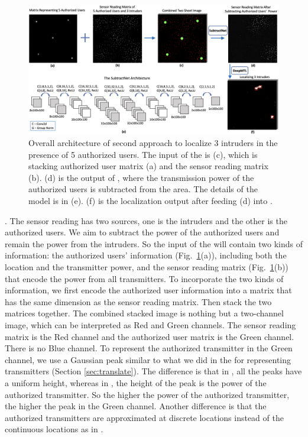 \begin{figure}
    \centering
    \includegraphics[width=\textwidth]{chapters/wowmom-pmc/figures/subtractnet2.png}
    \caption{Overall architecture of second approach to localize 3 intruders in the presence of 5 authorized users. The input of the \subtract is (c), which is stacking authorized user matrix (a) and the sensor reading matrix (b). (d) is the output of \subtract, where the transmission power of the authorized users is subtracted from the area. The details of the \subtract model is in (e). (f) is the localization output after feeding (d) into \our.}
    \label{fig:subtractnet}
\end{figure}

. The sensor reading has two sources, one is the intruders and the other is the authorized users.
We aim to subtract the power of the authorized users and remain the power from the intruders.
So the input of the \subtract will contain two kinds of information: the authorized users' information (Fig.~\ref{fig:subtractnet}(a)), including both the location and the transmitter power, and the sensor reading matrix (Fig.~\ref{fig:subtractnet}(b)) that encode the power from all transmitters.
To incorporate the two kinds of information, we first encode the authorized user information into a matrix that has the same dimension as the sensor reading matrix.
Then stack the two matrices together.
The combined stacked image is nothing but a two-channel image, which can be interpreted as Red and Green channels.
The sensor reading matrix is the Red channel and the authorized user matrix is the Green channel. There is no Blue channel.
To represent the authorized transmitter in the Green channel, we use a Gaussian peak similar to what we did in the \imgimg for representing transmitters (Section \ref{sec:translate}).
The difference is that in \imgimg, all the peaks have a uniform height, whereas in \subtract, the height of the peak is the power of the authorized transmitter.
So the higher the power of the authorized transmitter, the higher the peak in the Green channel.
Another difference is that the authorized transmitters are approximated at discrete locations instead of the continuous locations as in \imgimg.

